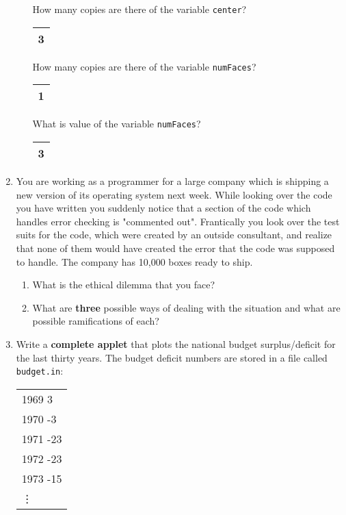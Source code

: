 \begin{enumerate}
\begin{enumerate}
		    How many copies are there of the variable {\tt center}? 
		    \begin{tabular}{|c|}
		    \hline
		    3\\
		    \hline
		    \end{tabular}
		    
		    How many copies are there of the variable {\tt numFaces}?
		    \begin{tabular}{|c|}
		    \hline
		    1\\
		    \hline
		    \end{tabular}
		    
		    What is value of the variable {\tt numFaces}?
		    \begin{tabular}{|c|}
		    \hline
		    3\\
		    \hline
		    \end{tabular}
            \end{enumerate}


        \item You are working as a programmer for a large company which 
		is shipping a new version 
        of its operating system next week.  While looking over the 
		code you have written 
        you suddenly notice that a section of the code which 
		handles error checking is "commented out". 
        Frantically you look over the test suits for the code, 
		which were created by an outside consultant, 
        and realize that none of them would have created the error 
		that the code was 
        supposed to handle.  The company has 10,000 boxes ready to ship.

		\begin{enumerate}
			\item What is the ethical dilemma that you face?

			\item What are {\bf three} possible ways of 
				dealing with the situation and 
				what are possible ramifications of each?

		\end{enumerate}


        \item Write a {\bf complete applet} that plots the national budget
	   surplus/deficit for the last thirty years.  
	   The budget deficit numbers
           are stored in a file called {\tt budget.in}: 

        	\begin{tabular}{|l|}
            	\hline
            	1969 3\\
            	1970 -3\\
            	1971 -23\\
            	1972 -23\\
            	1973 -15\\
		\vdots\\
            	\hline
        	\end{tabular}


\end{enumerate}

